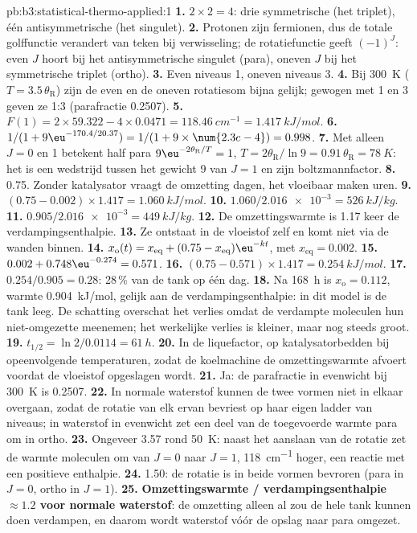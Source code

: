 \begin{solution}{pb:b3:statistical-thermo-applied:1}
\textbf{1.} $2 \times 2 = 4$: drie symmetrische (het triplet), één
antisymmetrische (het singulet).
\textbf{2.} Protonen zijn fermionen, dus de totale golffunctie verandert
van teken bij verwisseling; de rotatiefunctie geeft $(-1)^J$: even $J$
hoort bij het antisymmetrische singulet (para), oneven $J$ bij het
symmetrische triplet (ortho).
\textbf{3.} Even niveaus 1, oneven niveaus 3.
\textbf{4.} Bij \qty{300}{K} ($T = 3.5\,\theta_{\mathrm R}$) zijn de even en de
oneven rotatiesom bijna gelijk; gewogen met 1 en 3 geven ze 1:3
(parafractie 0.2507).
\textbf{5.} $F(1) = 2 \times 59.322 - 4 \times 0.0471 = \qty{118.46}{cm^{-1}} = \qty{1.417}{kJ/mol}$.
\textbf{6.} $1/(1 + 9\eu^{-170.4/20.37}) = 1/(1 + 9 \times \num{2.3e-4}) = 0.998$.
\textbf{7.} Met alleen $J = 0$ en 1 betekent half para $9\eu^{-2\theta_{\mathrm R}/T} = 1$, $T = 2\theta_{\mathrm R}/\ln9 =
0.91\,\theta_{\mathrm R} = \qty{78}{K}$: het is een wedstrijd tussen het
gewicht 9 van $J = 1$ en zijn boltzmannfactor.
\textbf{8.} 0.75. Zonder katalysator vraagt de omzetting dagen, het
vloeibaar maken uren.
\textbf{9.} $(0.75 - 0.002) \times 1.417 = \qty{1.060}{kJ/mol}$.
\textbf{10.} $1.060/\num{2.016e-3} = \qty{526}{kJ/kg}$.
\textbf{11.} $0.905/\num{2.016e-3} = \qty{449}{kJ/kg}$.
\textbf{12.} De omzettingswarmte is 1.17 keer de verdampingsenthalpie.
\textbf{13.} Ze ontstaat in de vloeistof zelf en komt niet via de wanden
binnen.
\textbf{14.} $x_{\mathrm o}(t) = x_{\mathrm{eq}} + (0.75 - x_{\mathrm{eq}})\eu^{-kt}$, met $x_{\mathrm{eq}} = 0.002$.
\textbf{15.} $0.002 + 0.748\eu^{-0.274} = 0.571$.
\textbf{16.} $(0.75 - 0.571) \times 1.417 = \qty{0.254}{kJ/mol}$.
\textbf{17.} $0.254/0.905 = 0.28$: 28\,\% van de tank op één dag.
\textbf{18.} Na \qty{168}{h} is $x_{\mathrm o} = 0.112$, warmte
\qty{0.904}{kJ/mol}, gelijk aan de verdampingsenthalpie: in dit model is
de tank leeg. De schatting overschat het verlies omdat de verdampte
moleculen hun niet-omgezette  meenemen; het werkelijke
verlies is kleiner, maar nog steeds groot.
\textbf{19.} $t_{1/2} = \ln2/0.0114 = \qty{61}{h}$.
\textbf{20.} In de liquefactor, op katalysatorbedden bij opeenvolgende
temperaturen, zodat de koelmachine de omzettingswarmte afvoert voordat de
vloeistof opgeslagen wordt.
\textbf{21.} Ja: de parafractie in evenwicht bij \qty{300}{K} is 0.2507.
\textbf{22.} In normale waterstof kunnen de twee vormen niet in elkaar
overgaan, zodat de rotatie van elk ervan bevriest op haar eigen ladder van
niveaus; in waterstof in evenwicht zet een deel van de toegevoerde warmte
para om in ortho.
\textbf{23.} Ongeveer 3.57 rond \qty{50}{K}: naast het aanslaan van de
rotatie zet de warmte moleculen om van $J = 0$ naar $J = 1$,
\qty{118}{cm^{-1}} hoger, een reactie met een positieve enthalpie.
\textbf{24.} 1.50: de rotatie is in beide vormen bevroren (para in $J = 0$,
ortho in $J = 1$).
\textbf{25.} \textbf{Omzettingswarmte / verdampingsenthalpie $\approx 1.2$
voor normale waterstof}: de omzetting alleen al zou de hele tank kunnen
doen verdampen, en daarom wordt waterstof vóór de opslag naar para
omgezet.
\end{solution}
